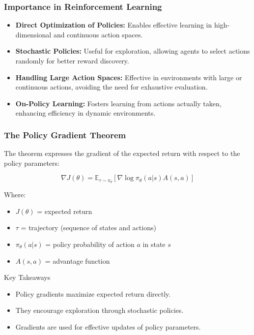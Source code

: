 \documentclass[aspectratio=169]{beamer}
\begin{document}
\begin{frame}[fragile]
    \frametitle{Importance in Reinforcement Learning}
    
    \begin{itemize}
        \item \textbf{Direct Optimization of Policies:} Enables effective learning in high-dimensional and continuous action spaces.
        \item \textbf{Stochastic Policies:} Useful for exploration, allowing agents to select actions randomly for better reward discovery.
        \item \textbf{Handling Large Action Spaces:} Effective in environments with large or continuous actions, avoiding the need for exhaustive evaluation.
        \item \textbf{On-Policy Learning:} Fosters learning from actions actually taken, enhancing efficiency in dynamic environments.
    \end{itemize}
    
\end{frame}

\begin{frame}[fragile]
    \frametitle{The Policy Gradient Theorem}

    The theorem expresses the gradient of the expected return with respect to the policy parameters:
    
    \begin{equation}
        \nabla J(\theta) = \mathbb{E}_{\tau \sim \pi_{\theta}} \left[ \nabla \log \pi_{\theta}(a | s) A(s, a) \right]
    \end{equation}

    Where:
    \begin{itemize}
        \item \( J(\theta) \) = expected return
        \item \( \tau \) = trajectory (sequence of states and actions)
        \item \( \pi_{\theta}(a | s) \) = policy probability of action \( a \) in state \( s \)
        \item \( A(s, a) \) = advantage function
    \end{itemize}
    
    \begin{block}{Key Takeaways}
        \begin{itemize}
            \item Policy gradients maximize expected return directly.
            \item They encourage exploration through stochastic policies.
            \item Gradients are used for effective updates of policy parameters.
        \end{itemize}
    \end{block}
    
\end{frame}
\end{document}
